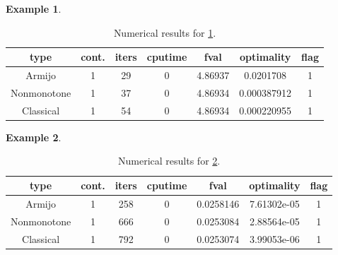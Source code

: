 \documentclass[a4paper]{article}
\newtheorem{example}{Example}
\newcommand{\mr}{\mathbb{R}}
\newcommand{\co}[1]{{\con{#1}}}
\begin{document}
  \begin{example}\label{exp3}
  \end{example}
  
  \begin{table}[p]
    \centering
    \begin{tabular}{cc|ccccc}
      \hline
      type & cont. & iters & cputime & 
      fval & optimality & flag \\ \hline
      Armijo & 1 & 29 & 0 & 4.86937 & 0.0201708 & 1 \\
      Nonmonotone & 1 & 37 & 0 & 4.86934 & 0.000387912 & 1 \\
      Classical & 1 & 54 & 0 & 4.86934 & 0.000220955 & 1 \\
      \hline
    \end{tabular}
    \caption{Numerical results for \cref{exp3}.}
    \label{tab3}
  \end{table}

\begin{example}\label{exp4}
\end{example}

\begin{table}[p]
  \centering
  \begin{tabular}{cc|ccccc}
    \hline
    type & cont. & iters & cputime & 
    fval & optimality & flag \\ \hline
    Armijo & 1 & 258 & 0 & 0.0258146 & 7.61302e-05 & 1 \\
    Nonmonotone & 1 & 666 & 0 & 0.0253084 & 2.88564e-05 & 1 \\
    Classical & 1 & 792 & 0 & 0.0253074 & 3.99053e-06 & 1 \\
    \hline
  \end{tabular}
  \caption{Numerical results for \cref{exp4}.}
  \label{tab4}
\end{table}
\end{document}
